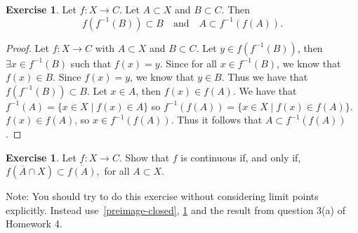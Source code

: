\documentclass[12pt]{article}
\providecommand{\arr}{\to}
\providecommand{\sm}{\setminus}
\renewcommand{\_}[1]{\underline{ #1 }}
\theoremstyle{definition}
\newtheorem{exercise}[theorem]{Exercise}
\numberwithin{equation}{subsection}
\begin{document}

\begin{exercise}\label{image-preimage}
Let $f\colon X\arr C$. Let $A\subset X$ and $B\subset C$. Then 
\[
f(f^{-1}(B))\subset B\quad\text{and}\quad A\subset f^{-1}(f(A)).
\]
\end{exercise}

\begin{proof}
Let $f : X \to C$ with $A \subset X$ and $B \subset C$. 
\newline Let $y \in f(f^{-1}(B))$, then $\exists x \in f^{-1}(B)$ such that $f(x) = y$. Since for all $x \in f^{-1}(B)$, we know that $f(x) \in B$. Since $f(x) = y$, we know that $y \in B$. Thus we have that $f(f^{-1}(B)) \subset B$. 
\newline Let $x \in A$, then $f(x) \in f(A)$. We have that $f^{-1}(A) = \{x \in X \mid f(x) \in A\}$ so $f^{-1}(f(A)) = \{x \in X \mid f(x) \in f(A)\}$. $f(x) \in f(A)$, so $x \in f^{-1}(f(A))$. Thus it follows that $A\subset f^{-1}(f(A))$.
\end{proof}

\begin{exercise} Let $f\colon X\arr C$.  Show that $f$ is continuous if, and only if, $f(\overline{A}\cap X)\subset \overline{f(A)},$ for all $A\subset X$.

Note: You should try to do this exercise without considering limit points explicitly. Instead use~\ref{preimage-closed}, \ref{image-preimage} and the result from question 3(a) of Homework 4.
\end{exercise}
\end{document}
